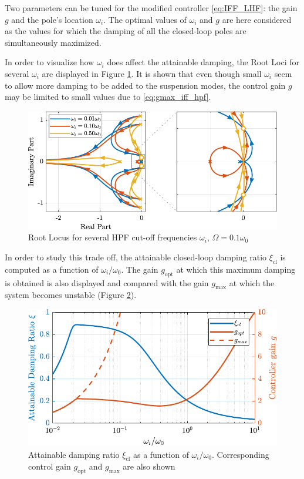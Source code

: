 \documentclass[Afour,sagev,times]{sagej}
\begin{document}
\par
Two parameters can be tuned for the modified controller \eqref{eq:IFF_LHF}: the gain \(g\) and the pole's location \(\omega_i\).
The optimal values of \(\omega_i\) and \(g\) are here considered as the values for which the damping of all the closed-loop poles are simultaneously maximized.

In order to visualize how \(\omega_i\) does affect the attainable damping, the Root Loci for several \(\omega_i\) are displayed in Figure \ref{fig:root_locus_wi_modified_iff}.
It is shown that even though small \(\omega_i\) seem to allow more damping to be added to the suspension modes, the control gain \(g\) may be limited to small values due to \eqref{eq:gmax_iff_hpf}.

\begin{figure}[htbp]
\centering
\includegraphics[width=\linewidth]{figs/root_locus_wi_modified_iff.pdf}
\caption{\label{fig:root_locus_wi_modified_iff}Root Locus for several HPF cut-off frequencies \(\omega_i\), \(\Omega = 0.1 \omega_0\)}
\end{figure}

In order to study this trade off, the attainable closed-loop damping ratio \(\xi_{\text{cl}}\) is computed as a function of \(\omega_i/\omega_0\).
The gain \(g_{\text{opt}}\) at which this maximum damping is obtained is also displayed and compared with the gain \(g_{\text{max}}\) at which the system becomes unstable (Figure \ref{fig:mod_iff_damping_wi}).

\begin{figure}[htbp]
\centering
\includegraphics[width=\linewidth]{figs/mod_iff_damping_wi.pdf}
\caption{\label{fig:mod_iff_damping_wi}Attainable damping ratio \(\xi_\text{cl}\) as a function of \(\omega_i/\omega_0\). Corresponding control gain \(g_\text{opt}\) and \(g_\text{max}\) are also shown}
\end{figure}
\end{document}
